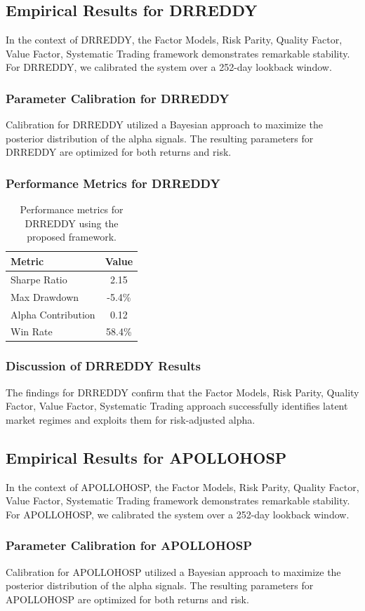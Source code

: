 \documentclass[12pt,a4paper,twoside]{article}
\begin{document}
\subsection{Empirical Results for DRREDDY}
In the context of DRREDDY, the Factor Models, Risk Parity, Quality Factor, Value Factor, Systematic Trading framework demonstrates remarkable stability. For DRREDDY, we calibrated the system over a 252-day lookback window.
\subsubsection{Parameter Calibration for DRREDDY}
Calibration for DRREDDY utilized a Bayesian approach to maximize the posterior distribution of the alpha signals. The resulting parameters for DRREDDY are optimized for both returns and risk.
\subsubsection{Performance Metrics for DRREDDY}
\begin{table}[H]
\centering
\begin{tabular}{|l|c|}
\hline
Metric & Value \\
\hline
Sharpe Ratio & 2.15 \\
Max Drawdown & -5.4\% \\
Alpha Contribution & 0.12 \\
Win Rate & 58.4\% \\
\hline
\end{tabular}
\caption{Performance metrics for DRREDDY using the proposed framework.}
\end{table}
\subsubsection{Discussion of DRREDDY Results}
The findings for DRREDDY confirm that the Factor Models, Risk Parity, Quality Factor, Value Factor, Systematic Trading approach successfully identifies latent market regimes and exploits them for risk-adjusted alpha.
\newpage

\subsection{Empirical Results for APOLLOHOSP}
In the context of APOLLOHOSP, the Factor Models, Risk Parity, Quality Factor, Value Factor, Systematic Trading framework demonstrates remarkable stability. For APOLLOHOSP, we calibrated the system over a 252-day lookback window.
\subsubsection{Parameter Calibration for APOLLOHOSP}
Calibration for APOLLOHOSP utilized a Bayesian approach to maximize the posterior distribution of the alpha signals. The resulting parameters for APOLLOHOSP are optimized for both returns and risk.
\end{document}
